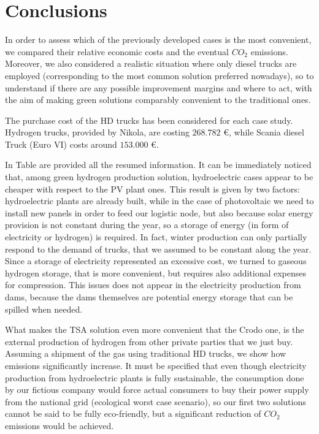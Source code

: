 \newpage
\chapter{Conclusions}
In order to assess which of the previously developed cases is the most convenient, we compared their relative economic costs and the eventual $CO_2$ emissions. Moreover, we also considered a realistic situation where only diesel trucks are employed (corresponding to the most common solution preferred nowadays), so to understand if there are any possible improvement margins and where to act, with the aim of making green solutions comparably convenient to the traditional ones.

The purchase cost of the HD trucks has been considered for each case study. Hydrogen trucks, provided by Nikola, are costing $268.782$ €, while Scania diesel Truck (Euro VI) costs around $153.000$ €.





In Table are provided all the resumed information. It can be immediately noticed that, among green hydrogen production solution, hydroelectric cases appear to be cheaper with respect to the PV plant ones. This result is given by two factors: hydroelectric plants are already built, while in the case of photovoltaic we need to install new panels in order to feed our logistic node, but also because solar energy provision is not constant during the year, so a storage of energy (in form of electricity or hydrogen) is required. In fact, winter production can only partially respond to the demand of trucks, that we assumed to be constant along the year. Since a storage of electricity represented an excessive cost, we turned to gaseous hydrogen storage, that is more convenient, but requires also additional expenses for compression. This issues does not appear in the electricity production from dams, because the dams themselves are potential energy storage that can be spilled when needed.

What makes the TSA solution even more convenient that the Crodo one, is the external production of hydrogen from other private parties that we just buy. Assuming a shipment of the gas using traditional HD trucks, we show how emissions significantly increase. It must be specified that even though electricity production from hydroelectric plants is fully sustainable, the consumption done by our fictious company would force actual consumers to buy their power supply from the national grid (ecological worst case scenario), so our first two solutions cannot be said to be fully eco-friendly, but a significant reduction of $CO_2$ emissions would be achieved.

